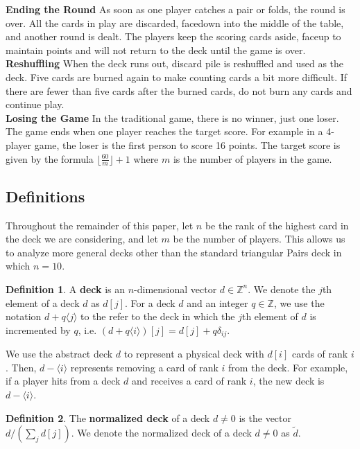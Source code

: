 \documentclass{article}
\theoremstyle{definition}
\newtheorem{definition}{Definition}
\newcounter{a}
\begin{document}
\textbf{Ending the Round} \indent
As soon as one player catches a pair or folds, the round is over.  All the cards in play are discarded, facedown into the middle of the table, and another round is dealt.  The players keep the scoring cards aside, faceup to maintain points and will not return to the deck until the game is over. \\
\textbf{Reshuffling} \indent
When the deck runs out, discard pile is reshuffled and used as the deck.  Five cards are burned again to make counting cards a bit more difficult.  If there are fewer than five cards after the burned cards, do not burn any cards and continue play.  \\
\textbf{Losing the Game} \indent
In the traditional game, there is no winner, just one loser.  The game ends when one player reaches the target score.  For example in a 4-player game, the loser is the first person to score 16 points.  The target score is given by the formula $\lfloor \frac{60}{m} \rfloor + 1$ where $m$ is the number of players in the game.

\subsection{Definitions}

Throughout the remainder of this paper, let $n$ be the rank of the highest card in the deck we are considering, and let $m$ be the number of players. This allows us to analyze more general decks other than the standard triangular Pairs deck in which $n=10$.

\begin{definition}
A \textbf{deck} is an $n$-dimensional vector $d \in \mathbb{Z}^n$. We denote the $j$th element of a deck $d$ as $d[j]$. For a deck $d$ and an integer $q \in \mathbb{Z}$, we use the notation $d+q\langle j \rangle$ to the refer to the deck in which the $j$th element of $d$ is incremented by $q$, i.e. $(d + q \langle i \rangle)[j] = d[j] + q\delta_{ij}$.
\end{definition}

We use the abstract deck $d$ to represent a physical deck with $d[i]$ cards of rank $i$. Then, $d-\langle i \rangle$ represents removing a card of rank $i$ from the deck. For example, if a player hits from a deck $d$ and receives a card of rank $i$, the new deck is $d-\langle i \rangle$.

\begin{definition}
The \textbf{normalized deck} of a deck $d \neq 0$ is the vector $d / \left(\sum_j d[j]\right)$. We denote the normalized deck of a deck $d \neq 0$ as $\tilde{d}$.
\end{definition}
\end{document}
